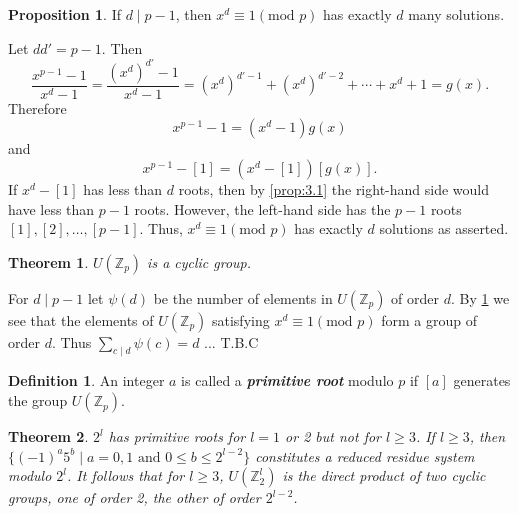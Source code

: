 \documentclass{article}
\makeatletter
\newtheorem{theorem}{Theorem}[section]
\theoremstyle{definition}
\newtheorem{prop}{Proposition}[section]
\newtheorem{definition}{Definition}[section]
\theoremstyle{remark}
\let\oldproofname=\proofname
\renewcommand{\proofname}{\textit{\oldproofname}}
\theoremstyle{definition}
\renewenvironment{proof}[1][\proofname]{\par
  \pushQED{\qed}%
  \normalfont \topsep6\p@\@plus6\p@\relax
  \list{}{\leftmargin=0mm
          \rightmargin=0mm
          \settowidth{\itemindent}{\itshape#1}%
          \labelwidth=\itemindent
          \parsep=0pt \listparindent=0mm%
  }
  \item[\hskip\labelsep
        \itshape
    #1\@addpunct{.}]\ignorespaces
}{%
  \popQED\endlist\@endpefalse
}
\makeatother
\begin{document}
    \begin{prop}\label{prop:3.2}
        If $d\mid p-1$, then $x^d\equiv 1(\text{mod }p)$ has exactly $d$ many solutions.
    \end{prop}
        \begin{proof}
            Let $dd'=p-1$. Then 
                \begin{equation*}
                    \frac{x^{p-1}-1}{x^d-1}=\frac{(x^d)^{d'}-1}{x^d-1}=(x^d)^{d'-1}+(x^d)^{d'-2}+\cdots+x^d+1=g(x).
                \end{equation*}
            Therefore
                \begin{equation*}
                    x^{p-1}-1=(x^d-1)g(x)
                \end{equation*}
            and
                \begin{equation*}
                    x^{p-1}-[1]=(x^d-[1])[g(x)].
                \end{equation*}
            If $x^d-[1]$ has less than $d$ roots, then by \cref{prop:3.1} the right-hand side would have less than $p-1$ roots. However, the left-hand side has the $p-1$ roots $[1],[2],\dots,[p-1]$. Thus, $x^d\equiv 1(\text{mod }p)$ has exactly $d$ solutions as asserted.
        \end{proof}\newpage
    \begin{theorem}\label{thm:3.1}
        $U(\mathbb{Z}_p)$ is a cyclic group. 
    \end{theorem}
        \begin{proof}
            For $d\mid p-1$ let $\psi(d)$ be the number of elements in $U(\mathbb{Z}_p)$ of order $d$. By \cref{prop:3.2} we see that the elements of $U(\mathbb{Z}_p)$ satisfying $x^d\equiv 1(\text{mod }p)$ form a group of order $d$. Thus $\sum_{c\mid d}\psi(c)=d$ ... T.B.C
        \end{proof}
    \begin{definition}\label{def:3.1}
        An integer $a$ is called a \textbf{\textit{primitive root}} modulo $p$ if $[a]$ generates the group $U(\mathbb{Z}_p)$.
    \end{definition}
    \begin{theorem}\label{thm:3.2}
        $2^l$ has primitive roots for $l=1$ or 2 but not for $l\geq 3$. If $l\geq 3$, then $\{(-1)^a5^b\mid a=0,1\text{ and }0\leq b\leq 2^{l-2}\}$ constitutes a reduced residue system modulo $2^l$. It follows that for $l\geq 3$, $U(\mathbb{Z}_2^l)$ is the direct product of two cyclic groups, one of order 2, the other of order $2^{l-2}$.
    \end{theorem}
\end{document}
